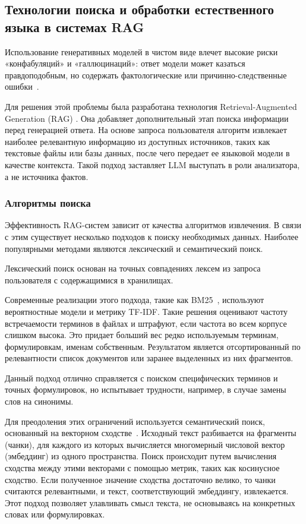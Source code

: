\subsection{Технологии поиска и обработки естественного языка в системах RAG}

Использование генеративных моделей в чистом виде
влечет высокие риски «конфабуляций» и «галлюцинаций»:
ответ модели может казаться правдоподобным, но содержать фактологические
или причинно-следственные ошибки~\cite{Ji_2023}.

Для решения этой проблемы была разработана технология
Retrieval-Augmented Generation (RAG) \cite{Lewis_2020}.
Она добавляет дополнительный этап поиска информации перед генерацией ответа.
На основе запроса пользователя алгоритм извлекает наиболее релевантную
информацию из доступных источников, таких как текстовые файлы или базы данных,
после чего передает ее языковой модели в качестве контекста.
Такой подход заставляет LLM выступать в роли анализатора,
а не источника фактов.

\subsubsection*{Алгоритмы поиска}

Эффективность RAG-систем зависит от качества алгоритмов извлечения.
В связи с этим существует несколько подходов к поиску необходимых данных.
Наиболее популярными методами являются лексический и семантический поиск.

Лексический поиск основан на точных совпадениях
лексем из запроса пользователя с содержащимися в хранилищах.

Современные реализации этого подхода,
такие как BM25~\cite{Robertson_2009}, используют
вероятностные модели и метрику TF-IDF.
Такие решения оценивают частоту встречаемости
терминов в файлах и штрафуют, если частота во всем корпусе слишком высока.
Это придает больший вес редко используемым терминам, формулировкам, именам собственным.
Результатом является отсортированный по релевантности
список документов или заранее выделенных из них фрагментов.

Данный подход отлично справляется с поиском специфических терминов и
точных формулировок, но
испытывает трудности, например, в случае замены слов на синонимы.

Для преодоления этих ограничений используется семантический поиск,
основанный на векторном сходстве~\cite{Karpukhin_2020}.
Исходный текст разбивается на фрагменты (чанки), для каждого из которых вычисляется
многомерный числовой вектор (эмбеддинг) из одного пространства.
Поиск происходит путем вычисления сходства между этими векторами
с помощью метрик, таких как косинусное сходство.
Если полученное значение сходства достаточно велико, то
чанки считаются релевантными, и текст, соответствующий эмбеддингу,
извлекается.
Этот подход позволяет улавливать смысл текста,
не основываясь на конкретных словах или формулировках.

